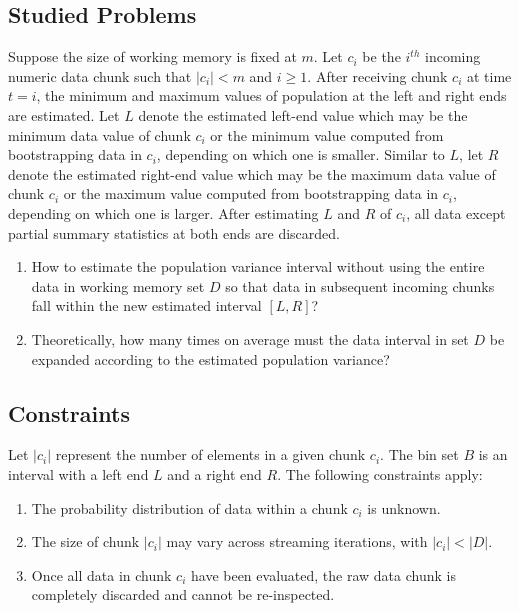 \documentclass[a4paper,fleqn]{cas-sc}
\begin{document}
\subsection{Studied Problems}
Suppose the size of working memory is fixed at $m$. Let $c_{i}$ be the $i^{th}$ incoming numeric data chunk such that $|c_{i}| < m$ and $i \geq 1$. After receiving chunk $c_{i}$ at time $t = i$, the minimum and maximum values of population at the left and right ends are estimated. Let $L$ denote the estimated left-end value which may be the minimum data value of chunk $c_{i}$ or the minimum value computed from bootstrapping data in $c_{i}$, depending on which one is smaller. Similar to $L$, let $R$ denote the estimated right-end value which may be the maximum data value of chunk $c_{i}$ or the maximum value computed from bootstrapping data in $c_{i}$, depending on which one is larger. After estimating $L$ and $R$ of $c_{i}$, all data except partial summary statistics at both ends are discarded.

\begin{enumerate}
    \item How to estimate the population variance interval without using the entire data in working memory set $D$ so that data in subsequent incoming chunks fall within the new estimated interval $[L, R]$?
    \item Theoretically, how many times on average must the data interval in set $D$ be expanded according to the estimated population variance?
\end{enumerate}

\subsection{Constraints}
Let $|c_i|$ represent the number of elements in a given chunk $c_i$. The bin set $B$ is an interval with a left end $L$ and a right end $R$. The following constraints apply:
\begin{enumerate}
    \item The probability distribution of data within a chunk $c_i$ is unknown.
    \item The size of chunk $|c_i|$ may vary across streaming iterations, with $|c_{i}| < |D|$.
    \item Once all data in chunk $c_i$ have been evaluated, the raw data chunk is completely discarded and cannot be re-inspected.
\end{enumerate}
\end{document}
